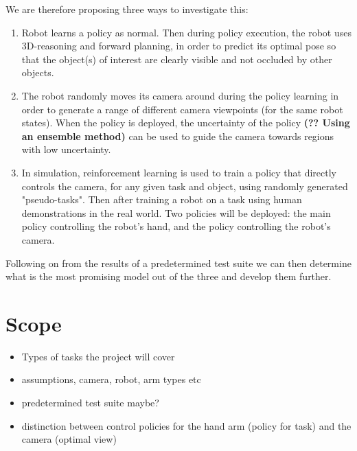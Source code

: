     We are therefore proposing three ways to investigate this:
    \begin{enumerate}
        \item Robot learns a policy as normal. Then during policy execution, the robot uses 3D-reasoning and forward planning, in order to predict its optimal pose so that the object(s) of interest are clearly visible and not occluded by other objects.
        \item The robot randomly moves its camera around during the policy learning in order to generate a range of different camera viewpoints (for the same robot states). When the policy is deployed, the uncertainty of the policy \textbf{(?? Using an ensemble method)} can be used to guide the camera towards regions with low uncertainty.
        \item In simulation, reinforcement learning is used to train a policy that directly controls the camera, for any given task and object, using randomly generated "pseudo-tasks". Then after training a robot on a task using human demonstrations in the real world. Two policies will be deployed: the main policy controlling the robot's hand, and the policy controlling the robot's camera.
    \end{enumerate}

    Following on from the results of a predetermined test suite we can then determine what is the most promising model out of the three and develop them further.
\section{Scope} 

\begin{itemize}
  \item Types of tasks the project will cover 
  \item assumptions, camera, robot, arm types etc
  \item predetermined test suite maybe?
  \item distinction between control policies for the hand arm (policy for task) and the camera (optimal view)
\end{itemize}

